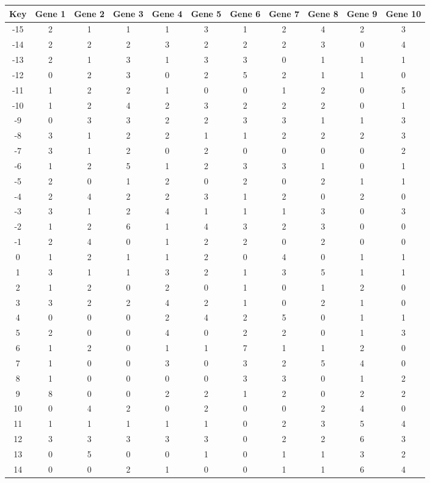 \begin{tabular}{|c|c|c|c|c|c|c|c|c|c|c|}
\hline
Key & Gene 1 & Gene 2 & Gene 3 & Gene 4 & Gene 5 & Gene 6 & Gene 7 & Gene 8 & Gene 9 & Gene 10 \\
\hline
-15 & 2 & 1 & 1 & 1 & 3 & 1 & 2 & 4 & 2 & 3 \\
-14 & 2 & 2 & 2 & 3 & 2 & 2 & 2 & 3 & 0 & 4 \\
-13 & 2 & 1 & 3 & 1 & 3 & 3 & 0 & 1 & 1 & 1 \\
-12 & 0 & 2 & 3 & 0 & 2 & 5 & 2 & 1 & 1 & 0 \\
-11 & 1 & 2 & 2 & 1 & 0 & 0 & 1 & 2 & 0 & 5 \\
-10 & 1 & 2 & 4 & 2 & 3 & 2 & 2 & 2 & 0 & 1 \\
-9 & 0 & 3 & 3 & 2 & 2 & 3 & 3 & 1 & 1 & 3 \\
-8 & 3 & 1 & 2 & 2 & 1 & 1 & 2 & 2 & 2 & 3 \\
-7 & 3 & 1 & 2 & 0 & 2 & 0 & 0 & 0 & 0 & 2 \\
-6 & 1 & 2 & 5 & 1 & 2 & 3 & 3 & 1 & 0 & 1 \\
-5 & 2 & 0 & 1 & 2 & 0 & 2 & 0 & 2 & 1 & 1 \\
-4 & 2 & 4 & 2 & 2 & 3 & 1 & 2 & 0 & 2 & 0 \\
-3 & 3 & 1 & 2 & 4 & 1 & 1 & 1 & 3 & 0 & 3 \\
-2 & 1 & 2 & 6 & 1 & 4 & 3 & 2 & 3 & 0 & 0 \\
-1 & 2 & 4 & 0 & 1 & 2 & 2 & 0 & 2 & 0 & 0 \\
0 & 1 & 2 & 1 & 1 & 2 & 0 & 4 & 0 & 1 & 1 \\
1 & 3 & 1 & 1 & 3 & 2 & 1 & 3 & 5 & 1 & 1 \\
2 & 1 & 2 & 0 & 2 & 0 & 1 & 0 & 1 & 2 & 0 \\
3 & 3 & 2 & 2 & 4 & 2 & 1 & 0 & 2 & 1 & 0 \\
4 & 0 & 0 & 0 & 2 & 4 & 2 & 5 & 0 & 1 & 1 \\
5 & 2 & 0 & 0 & 4 & 0 & 2 & 2 & 0 & 1 & 3 \\
6 & 1 & 2 & 0 & 1 & 1 & 7 & 1 & 1 & 2 & 0 \\
7 & 1 & 0 & 0 & 3 & 0 & 3 & 2 & 5 & 4 & 0 \\
8 & 1 & 0 & 0 & 0 & 0 & 3 & 3 & 0 & 1 & 2 \\
9 & 8 & 0 & 0 & 2 & 2 & 1 & 2 & 0 & 2 & 2 \\
10 & 0 & 4 & 2 & 0 & 2 & 0 & 0 & 2 & 4 & 0 \\
11 & 1 & 1 & 1 & 1 & 1 & 0 & 2 & 3 & 5 & 4 \\
12 & 3 & 3 & 3 & 3 & 3 & 0 & 2 & 2 & 6 & 3 \\
13 & 0 & 5 & 0 & 0 & 1 & 0 & 1 & 1 & 3 & 2 \\
14 & 0 & 0 & 2 & 1 & 0 & 0 & 1 & 1 & 6 & 4 \\
\hline
\end{tabular}